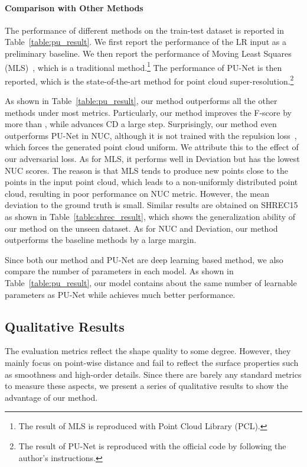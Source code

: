 \documentclass[10pt,twocolumn,letterpaper]{article}
\begin{document}
\vspace{-1em}
\paragraph{Comparison with Other Methods}
The performance of different methods on the train-test dataset is reported in Table~\ref{table:pu_result}.
We first report the performance of the LR input as a preliminary baseline.
We then report the performance of Moving Least Squares (MLS)~\cite{alexa2003computing}, which is a traditional method.\footnote{The result of MLS is reproduced with Point Cloud Library (PCL).}
The performance of PU-Net is then reported, which is the state-of-the-art method for point cloud super-resolution.\footnote{The result of PU-Net is reproduced with the official code by following the author's instructions.}

As shown in Table~\ref{table:pu_result}, our method outperforms all the other methods under most metrics.
Particularly, our method improves the F-score by more than , while advances CD a large step.
Surprisingly, our method even outperforms PU-Net in NUC, although it is not trained with the repulsion loss~\cite{yu2018pu}, which forces the generated point cloud uniform.
We attribute this to the effect of our adversarial loss.
As for MLS, it performs well in Deviation but has the lowest NUC scores.
The reason is that MLS tends to produce new points close to the points in the input point cloud, which leads to a non-uniformly distributed point cloud, resulting in poor performance on NUC metric.
However, the mean deviation to the ground truth is small.
Similar results are obtained on SHREC15 as shown in Table~\ref{table:shrec_result}, which shows the generalization ability of our method on the unseen dataset.
As for NUC and Deviation, our method outperforms the baseline methods by a large margin.

Since both our method and PU-Net are deep learning based method, we also compare the number of parameters in each model.
As shown in Table~\ref{table:pu_result}, our model contains about the same number of learnable parameters as PU-Net while achieves much better performance.

\subsection{Qualitative Results}
The evaluation metrics reflect the shape quality to some degree.
However, they mainly focus on point-wise distance and fail to reflect the surface properties such as smoothness and high-order details.
Since there are barely any standard metrics to measure these aspects, we present a series of qualitative results to show the advantage of our method.
\end{document}
